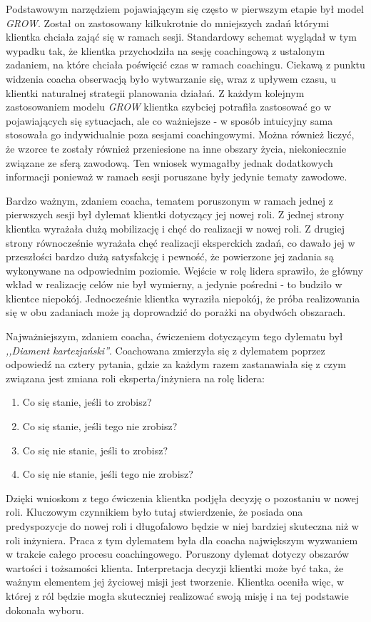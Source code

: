 Podstawowym narzędziem pojawiającym się często w pierwszym etapie był model \emph{GROW}. Został on zastosowany kilkukrotnie do mniejszych zadań
którymi klientka chciała zająć się w ramach sesji. Standardowy schemat wyglądał w tym wypadku tak, że klientka przychodziła na sesję coachingową
z ustalonym zadaniem, na które chciała poświęcić czas w ramach coachingu. Ciekawą z punktu widzenia coacha obserwacją było wytwarzanie się, wraz z upływem
czasu, u klientki naturalnej strategii planowania działań. Z każdym kolejnym zastosowaniem modelu \emph{GROW} klientka szybciej potrafiła zastosować
go w pojawiających się sytuacjach, ale co ważniejsze - w sposób intuicyjny sama stosowała go indywidualnie poza sesjami coachingowymi. Można również liczyć,
że wzorce te zostały również przeniesione na inne obszary życia, niekoniecznie związane ze sferą zawodową. Ten wniosek wymagałby jednak dodatkowych
informacji ponieważ w ramach sesji poruszane były jedynie tematy zawodowe.

Bardzo ważnym, zdaniem coacha, tematem poruszonym w ramach jednej z pierwszych sesji był dylemat klientki dotyczący jej nowej roli.
Z jednej strony klientka wyrażała dużą mobilizację i chęć do realizacji w nowej roli. Z drugiej strony równocześnie wyrażała chęć realizacji
eksperckich zadań, co dawało jej w przeszłości bardzo dużą satysfakcję i pewność, że powierzone jej zadania są wykonywane na odpowiednim poziomie.
Wejście w rolę lidera sprawiło, że główny wkład w realizację celów nie był wymierny, a jedynie pośredni - to budziło w klientce niepokój.
Jednocześnie klientka wyraziła niepokój, że próba realizowania się w obu zadaniach może ją doprowadzić do porażki na obydwóch obszarach.

Najważniejszym, zdaniem coacha, ćwiczeniem dotyczącym tego dylematu był \emph{,,Diament kartezjański''}.
Coachowana zmierzyła się z dylematem poprzez odpowiedź na cztery pytania, gdzie za każdym razem zastanawiała się z czym związana jest zmiana
roli eksperta/inżyniera na rolę lidera:
\begin{enumerate}
\item Co się stanie, jeśli to zrobisz?
\item Co się stanie, jeśli tego nie zrobisz?
\item Co się nie stanie, jeśli to zrobisz?
\item Co się nie stanie, jeśli tego nie zrobisz?
\end{enumerate}
Dzięki wnioskom z tego ćwiczenia klientka podjęła decyzję o pozostaniu w nowej roli. Kluczowym czynnikiem było tutaj stwierdzenie, że posiada
ona predyspozycje do nowej roli i długofalowo będzie w niej bardziej skuteczna niż w roli inżyniera. Praca z tym dylematem była dla coacha
największym wyzwaniem w trakcie całego procesu coachingowego. Poruszony dylemat dotyczy obszarów wartości i tożsamości klienta. Interpretacja
decyzji klientki może być taka, że ważnym elementem jej życiowej misji jest tworzenie. Klientka oceniła więc, w której z ról będzie mogła skuteczniej
realizować swoją misję i na tej podstawie dokonała wyboru.

